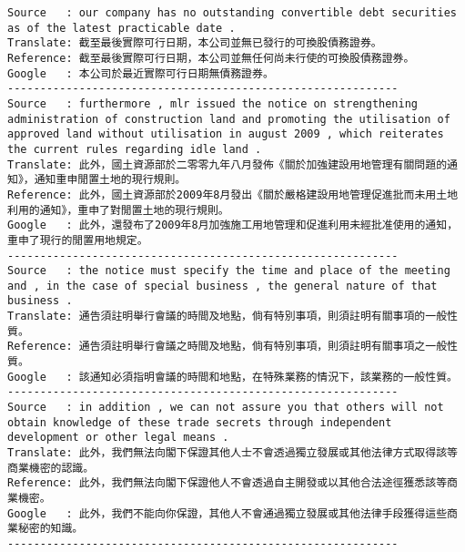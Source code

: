 \documentclass[11pt]{article}
\begin{document}
    \begin{Verbatim}[commandchars=\\\{\}]
Source   : our company has no outstanding convertible debt securities as of the latest practicable date .
Translate: 截至最後實際可行日期，本公司並無已發行的可換股債務證券。
Reference: 截至最後實際可行日期，本公司並無任何尚未行使的可換股債務證券。
Google   : 本公司於最近實際可行日期無債務證券。
------------------------------------------------------------
Source   : furthermore , mlr issued the notice on strengthening administration of construction land and promoting the utilisation of approved land without utilisation in august 2009 , which reiterates the current rules regarding idle land .
Translate: 此外，國土資源部於二零零九年八月發佈《關於加強建設用地管理有關問題的通知》，通知重申閒置土地的現行規則。
Reference: 此外，國土資源部於2009年8月發出《關於嚴格建設用地管理促進批而未用土地利用的通知》，重申了對閒置土地的現行規則。
Google   : 此外，還發布了2009年8月加強施工用地管理和促進利用未經批准使用的通知，重申了現行的閒置用地規定。
------------------------------------------------------------
Source   : the notice must specify the time and place of the meeting and , in the case of special business , the general nature of that business .
Translate: 通告須註明舉行會議的時間及地點，倘有特別事項，則須註明有關事項的一般性質。
Reference: 通告須註明舉行會議之時間及地點，倘有特別事項，則須註明有關事項之一般性質。
Google   : 該通知必須指明會議的時間和地點，在特殊業務的情況下，該業務的一般性質。
------------------------------------------------------------
Source   : in addition , we can not assure you that others will not obtain knowledge of these trade secrets through independent development or other legal means .
Translate: 此外，我們無法向閣下保證其他人士不會透過獨立發展或其他法律方式取得該等商業機密的認識。
Reference: 此外，我們無法向閣下保證他人不會透過自主開發或以其他合法途徑獲悉該等商業機密。
Google   : 此外，我們不能向你保證，其他人不會通過獨立發展或其他法律手段獲得這些商業秘密的知識。
------------------------------------------------------------

    \end{Verbatim}
\end{document}
